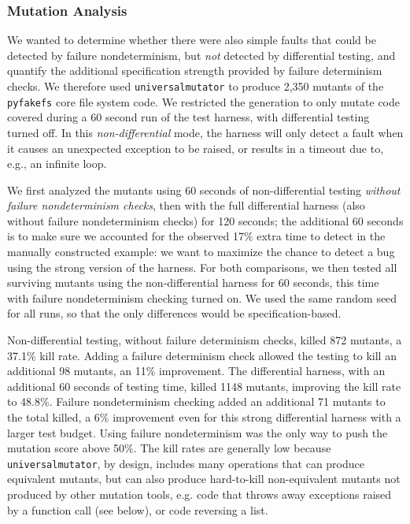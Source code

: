 \subsubsection{Mutation Analysis}

We wanted to determine whether there were also simple faults that
could be detected by failure nondeterminism, but \emph{not} detected
by differential testing, and quantify the additional specification
strength provided by failure determinism checks.  We therefore used
{\tt universalmutator} \cite{RegExpMut} to produce 2,350 mutants of
the {\tt pyfakefs} core file system code.   We restricted the generation
to only mutate code covered during a 60 second run of the test
harness, with differential testing turned off.  In this
\emph{non-differential} mode, the harness will only detect a fault when it
causes an unexpected exception to be raised, or results in a timeout
due to, e.g., an infinite loop.

We first analyzed the mutants using 60 seconds of non-differential
testing \emph{without failure nondeterminism checks}, then with the
full differential harness (also without failure nondeterminism checks)
for 120 seconds; the additional 60 seconds is to make sure we accounted for the observed 17\%
extra time to detect in the manually constructed example: we want to
maximize the chance to detect a bug using the strong version of the harness.   For both comparisons, we then tested
all surviving mutants using the non-differential harness for 60
seconds, this time with failure nondeterminism checking turned on.
We used the same random seed for
all runs, so that the only differences would be specification-based.

Non-differential testing, without failure determinism checks, killed
872 mutants, a 37.1\% kill rate.  Adding a failure determinism check
allowed the testing to kill an additional 98 mutants, an 11\% improvement.
The differential harness, with an additional 60 seconds of testing
time, killed 1148 mutants, improving the kill rate to 48.8\%.  Failure
nondeterminism checking added an
additional 71 mutants to the total killed, a 6\% improvement even for
this strong differential harness with a larger test budget.  Using
failure nondeterminism was the only way to push the mutation score
above 50\%.  The kill rates are generally low
because {\tt universalmutator}, by design, includes many operations
that can produce equivalent mutants, but can also produce hard-to-kill
non-equivalent mutants not produced by other mutation tools, e.g. code
that throws away exceptions raised by a function call (see below), or code
reversing a list.

